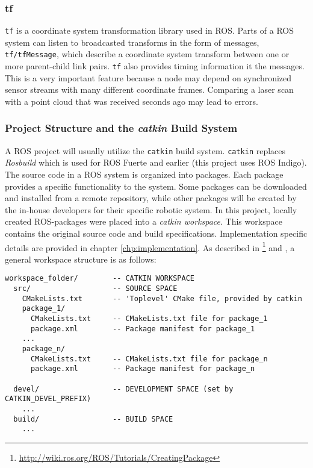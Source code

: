 \subsubsection{tf}

\texttt{tf}\cite{tf_paper} is a coordinate system transformation library used in \ac{ROS}. Parts of a \ac{ROS} system can listen to broadcasted transforms in the form of messages, \texttt{tf/tfMessage}, which describe a coordinate system transform between one or more parent-child link pairs. \texttt{tf} also provides timing information it the messages. This is a very important feature because a node may depend on synchronized sensor streams with many different coordinate frames. Comparing a laser scan with a point cloud that was received seconds ago may lead to errors. 

\subsubsection{Project Structure and the \textit{catkin} Build System}
\label{sec:catkin}
A \ac{ROS} project will usually utilize the \texttt{catkin} build system. \texttt{catkin} replaces \textit{Rosbuild} which is used for ROS Fuerte and earlier (this project uses \ac{ROS} Indigo). The source code in a \ac{ROS} system is organized into packages. Each package provides a specific functionality to the system. Some packages can be downloaded and installed from a remote repository, while other packages will be created by the in-house developers for their specific robotic system. In this project, locally created ROS-packages were placed into a \textit{catkin workspace}. This workspace contains the  original source code and build specifications. Implementation specific details are provided in chapter \ref{chp:implementation}. As described in \cite{ROS_tut_pkg}\footnote{\url{http://wiki.ros.org/ROS/Tutorials/CreatingPackage}} and \cite{ROS_catkin}, a general workspace structure is as follows:

\begin{verbatim}
workspace_folder/        -- CATKIN WORKSPACE
  src/                   -- SOURCE SPACE
    CMakeLists.txt       -- 'Toplevel' CMake file, provided by catkin
    package_1/
      CMakeLists.txt     -- CMakeLists.txt file for package_1
      package.xml        -- Package manifest for package_1
    ...
    package_n/
      CMakeLists.txt     -- CMakeLists.txt file for package_n
      package.xml        -- Package manifest for package_n
      
  devel/                 -- DEVELOPMENT SPACE (set by CATKIN_DEVEL_PREFIX)
    ...
  build/                 -- BUILD SPACE
    ...
\end{verbatim}

